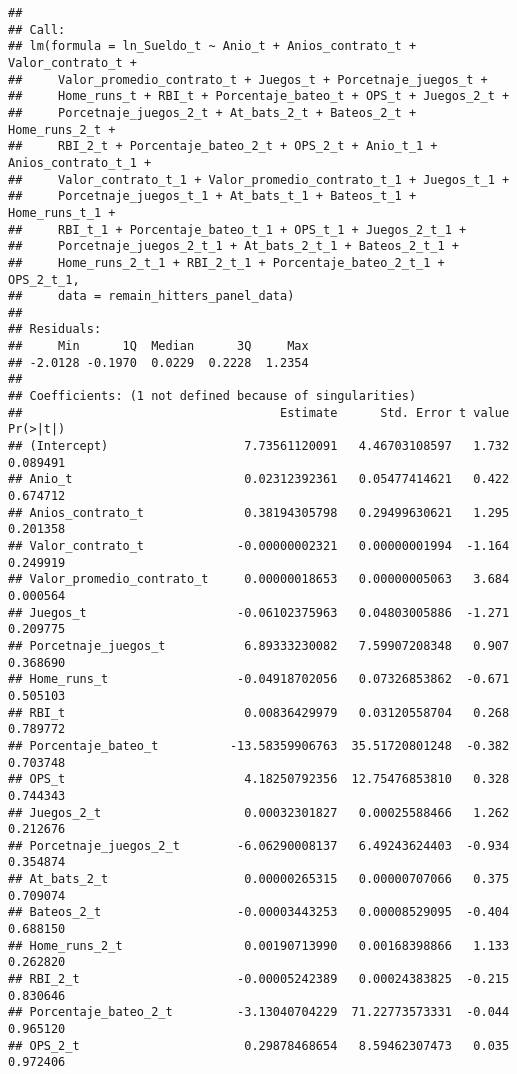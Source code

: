 \documentclass[
]{article}
\begin{document}
\begin{verbatim}
## 
## Call:
## lm(formula = ln_Sueldo_t ~ Anio_t + Anios_contrato_t + Valor_contrato_t + 
##     Valor_promedio_contrato_t + Juegos_t + Porcetnaje_juegos_t + 
##     Home_runs_t + RBI_t + Porcentaje_bateo_t + OPS_t + Juegos_2_t + 
##     Porcetnaje_juegos_2_t + At_bats_2_t + Bateos_2_t + Home_runs_2_t + 
##     RBI_2_t + Porcentaje_bateo_2_t + OPS_2_t + Anio_t_1 + Anios_contrato_t_1 + 
##     Valor_contrato_t_1 + Valor_promedio_contrato_t_1 + Juegos_t_1 + 
##     Porcetnaje_juegos_t_1 + At_bats_t_1 + Bateos_t_1 + Home_runs_t_1 + 
##     RBI_t_1 + Porcentaje_bateo_t_1 + OPS_t_1 + Juegos_2_t_1 + 
##     Porcetnaje_juegos_2_t_1 + At_bats_2_t_1 + Bateos_2_t_1 + 
##     Home_runs_2_t_1 + RBI_2_t_1 + Porcentaje_bateo_2_t_1 + OPS_2_t_1, 
##     data = remain_hitters_panel_data)
## 
## Residuals:
##     Min      1Q  Median      3Q     Max 
## -2.0128 -0.1970  0.0229  0.2228  1.2354 
## 
## Coefficients: (1 not defined because of singularities)
##                                    Estimate      Std. Error t value Pr(>|t|)
## (Intercept)                   7.73561120091   4.46703108597   1.732 0.089491
## Anio_t                        0.02312392361   0.05477414621   0.422 0.674712
## Anios_contrato_t              0.38194305798   0.29499630621   1.295 0.201358
## Valor_contrato_t             -0.00000002321   0.00000001994  -1.164 0.249919
## Valor_promedio_contrato_t     0.00000018653   0.00000005063   3.684 0.000564
## Juegos_t                     -0.06102375963   0.04803005886  -1.271 0.209775
## Porcetnaje_juegos_t           6.89333230082   7.59907208348   0.907 0.368690
## Home_runs_t                  -0.04918702056   0.07326853862  -0.671 0.505103
## RBI_t                         0.00836429979   0.03120558704   0.268 0.789772
## Porcentaje_bateo_t          -13.58359906763  35.51720801248  -0.382 0.703748
## OPS_t                         4.18250792356  12.75476853810   0.328 0.744343
## Juegos_2_t                    0.00032301827   0.00025588466   1.262 0.212676
## Porcetnaje_juegos_2_t        -6.06290008137   6.49243624403  -0.934 0.354874
## At_bats_2_t                   0.00000265315   0.00000707066   0.375 0.709074
## Bateos_2_t                   -0.00003443253   0.00008529095  -0.404 0.688150
## Home_runs_2_t                 0.00190713990   0.00168398866   1.133 0.262820
## RBI_2_t                      -0.00005242389   0.00024383825  -0.215 0.830646
## Porcentaje_bateo_2_t         -3.13040704229  71.22773573331  -0.044 0.965120
## OPS_2_t                       0.29878468654   8.59462307473   0.035 0.972406

\end{verbatim}
\end{document}
